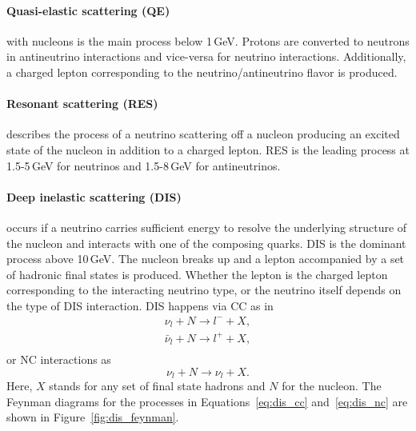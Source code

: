 \paragraph{Quasi-elastic scattering (QE)} with nucleons is the main process below 1\,GeV.
Protons are converted to neutrons in antineutrino interactions and vice-versa for neutrino interactions.
Additionally, a charged lepton corresponding to the neutrino/antineutrino flavor is produced.

\paragraph{Resonant scattering (RES)} describes the process of a neutrino scattering off a nucleon producing an excited state of the nucleon in addition to a charged lepton.
RES is the leading process at 1.5-5\,GeV for neutrinos and 1.5-8\,GeV for antineutrinos.

\paragraph{Deep inelastic scattering (DIS)} occurs if a neutrino carries sufficient energy to resolve the underlying structure of the nucleon and interacts with one of the composing quarks.
DIS is the dominant process above 10\,GeV. The nucleon breaks up and a lepton accompanied by a set of hadronic final states is produced.
Whether the lepton is the charged lepton corresponding to the interacting neutrino type, or the neutrino itself depends on the type of DIS interaction.
DIS happens via CC as in 
\begin{equation}
    \begin{split}
        \nu_l + N \rightarrow l^- + X, \\
        \bar{\nu}_l + N \rightarrow l^+ + X, \\
    \end{split}
    \label{eq:dis_cc}
\end{equation}
or NC interactions as
\begin{equation}
    \nu_l + N \rightarrow \nu_l + X.
        \label{eq:dis_nc}
\end{equation}
Here, $X$ stands for any set of final state hadrons and $N$ for the nucleon.
The Feynman diagrams for the processes in Equations~\eqref{eq:dis_cc} and~\eqref{eq:dis_nc} are shown in Figure~\ref{fig:dis_feynman}.

